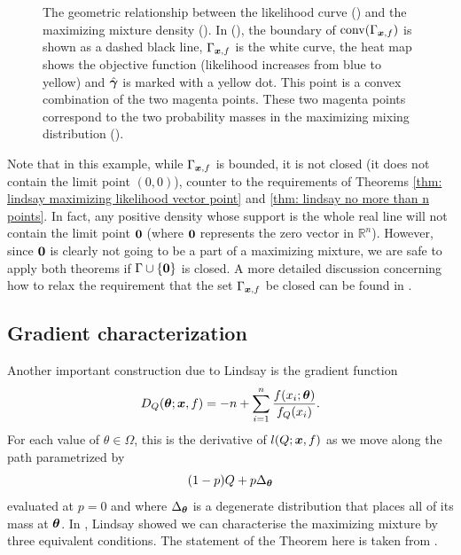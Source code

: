 \begin{figure}[ht]
			\caption[The geometric relationship between the likelihood curve () and the maximizing mixture density ().]{The geometric relationship between the likelihood curve () and the maximizing mixture density (). In (), the boundary of $\mathrm{conv}(\Gamma_{{\bm{{x}}}, f})$ is shown as a dashed black line, $\Gamma_{{\bm{{x}}}, f}$ is the white curve, the heat map  shows the objective function (likelihood increases from blue to yellow) and $\hat{{\bm{{\gamma}}}}$ is marked with a yellow dot. This point is a convex combination of the two magenta points. These two magenta points correspond to the two probability masses in the maximizing mixing distribution ().}
			\label{fig:GammaSol}
		\end{figure}

		\begin{remark}
			Note that in this example, while $\Gamma_{{\bm{{x}}}, f}$ is bounded, it is not closed (it does not contain the limit point $(0,0)$), counter to the requirements of Theorems \ref{thm: lindsay maximizing likelihood vector point} and \ref{thm: lindsay no more than n points}. In fact, any positive density whose support is the whole real line will not contain the limit point ${\bm{{0}}}$ (where ${\bm{{0}}}$ represents the zero vector in $\mathbb{R}^n$). However, since ${\bm{{0}}}$ is clearly not going to be a part of a maximizing mixture, we are safe to apply both theorems if $\Gamma \cup \{ {\bm{{0}}} \}$ is closed. A more detailed discussion concerning how to relax the requirement that the set $\Gamma_{{\bm{{x}}},f}$ be closed can be found in \cite[Section 5.2.2.]{Lindsay1995-sq}.
		\end{remark}

	\subsection{Gradient characterization}
	\label{sec: gradient characterization}
	Another important construction due to Lindsay is the gradient function
	\begin{equation}
		D_Q({\bm{{\theta}}}; {\bm{{x}}}, f) = -n + \sum_{i = 1}^n \frac{f(x_i;{\bm{{\theta}}})}{f_Q(x_i)}.
		\label{eq:def gradient function}
	\end{equation}
	For each value of $\theta \in \Omega$, this is the derivative of $l(Q;{\bm{{x}}},f)$ as we move along the path parametrized by
	\begin{equation}
		(1 - p)Q + p\Delta_{\bm{{\theta}}}
	\end{equation}
	evaluated at $p = 0$ and where $\Delta_{\bm{{\theta}}}$ is a degenerate distribution that places all of its mass at ${\bm{{\theta}}}$. In \cite[Theorem 4.1]{Lindsay1983-tf}, Lindsay showed we can characterise the maximizing mixture by three equivalent conditions. The statement of the Theorem here is taken from \cite[Theorem 19]{Lindsay1995-sq}.

